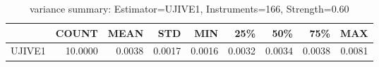 \begin{table}[ht]
\centering
\caption{variance summary: Estimator=UJIVE1, Instruments=166, Strength=0.60}
\begin{tabular}{lrrrrrrrr}
\toprule
 & COUNT & MEAN & STD & MIN & 25\% & 50\% & 75\% & MAX \\
\midrule
UJIVE1 & 10.0000 & 0.0038 & 0.0017 & 0.0016 & 0.0032 & 0.0034 & 0.0038 & 0.0081 \\
\bottomrule
\end{tabular}
\end{table}
